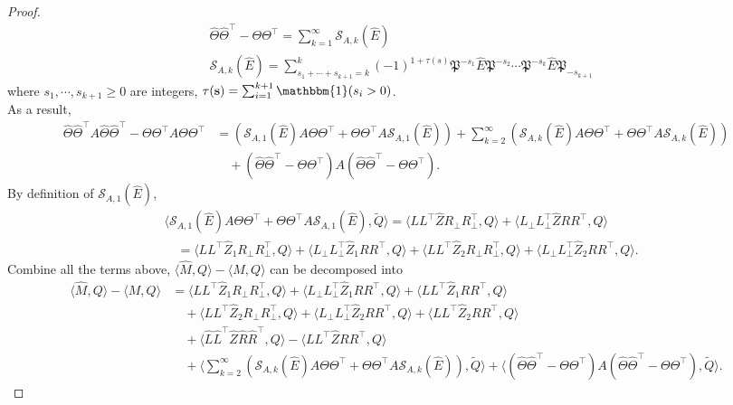 \documentclass[12pt]{article}
\newcommand{\inp}[2]{\langle #1,#2\rangle}
\theoremstyle{plain}
\begin{document}
\begin{proof}
\begin{align*}
    &\widehat{\Theta}\widehat{\Theta}^{\top}-\Theta\Theta^{\top}=\sum_{k=1}^{\infty}\mathcal{S}_{A,k}(\widehat{E}) \\
    &\mathcal{S}_{A,k}(\widehat{E})=\sum_{s_1+\cdots+s_{k+1}=k}^{k} (-1)^{1+\tau(s)} \mathfrak{P}^{-s_1}\widehat{E}\mathfrak{P}^{-s_2}\cdots\mathfrak{P}^{-s_k}\widehat{E}\mathfrak{P}_{-s_{k+1}}
\end{align*}
where $s_1,\cdots,s_{k+1}\geq 0$ are integers, $\tau(\mathbf{s})=\sum_{i=1}^{k+1}\mathbbm{1}(s_i>0)$. \\
As a result, 
\begin{align*}
    \widehat{\Theta}\widehat{\Theta}^{\top}A\widehat{\Theta}\widehat{\Theta}^{\top}-\Theta\Theta^{\top}A\Theta\Theta^{\top}&= (\mathcal{S}_{A,1}(\widehat{E})A\Theta\Theta^{\top}+\Theta\Theta^{\top}A\mathcal{S}_{A,1}(\widehat{E})) + \sum_{k=2}^{\infty} (\mathcal{S}_{A,k}(\widehat{E})A\Theta\Theta^{\top}+\Theta\Theta^{\top}A\mathcal{S}_{A,k}(\widehat{E})) \\ &\quad + (\widehat{\Theta}\widehat{\Theta}^{\top}-\Theta\Theta^{\top})A(\widehat{\Theta}\widehat{\Theta}^{\top}-\Theta\Theta^{\top}).
\end{align*}
By definition of $\mathcal{S}_{A,1}(\widehat{E})$, 
\begin{align*}
    &\inp{\mathcal{S}_{A,1}(\widehat{E})A\Theta\Theta^{\top}+\Theta\Theta^{\top}A\mathcal{S}_{A,1}(\widehat{E})}{\widetilde{Q}}= \inp{LL^{\top}\widehat{Z}R_{\perp}R_{\perp}^{\top}}{Q} + \inp{L_{\perp}L_{\perp}^{\top}\widehat{Z}RR^{\top}}{Q} \\
    &\quad =\inp{LL^{\top}\widehat{Z}_1R_{\perp}R_{\perp}^{\top}}{Q} + \inp{L_{\perp}L_{\perp}^{\top}\widehat{Z}_1RR^{\top}}{Q}  + \inp{LL^{\top}\widehat{Z}_2R_{\perp}R_{\perp}^{\top}}{Q} + \inp{L_{\perp}L_{\perp}^{\top}\widehat{Z}_2RR^{\top}}{Q}.
\end{align*}
Combine all the terms above, $\inp{\widehat{M}}{Q}-\inp{M}{Q}$ can be decomposed into
\begin{align}
    \inp{\widehat{M}}{Q}-\inp{M}{Q}&= \inp{LL^{\top}\widehat{Z}_1R_{\perp}R_{\perp}^{\top}}{Q} + \inp{L_{\perp}L_{\perp}^{\top}\widehat{Z}_1RR^{\top}}{Q} + \inp{LL^{\top}\widehat{Z}_1RR^{\top}}{Q} \label{main1} \\ &\quad + \inp{LL^{\top}\widehat{Z}_2R_{\perp}R_{\perp}^{\top}}{Q} + \inp{L_{\perp}L_{\perp}^{\top}\widehat{Z}_2RR^{\top}}{Q} + \inp{LL^{\top}\widehat{Z}_2RR^{\top}}{Q}\label{neg1} \\ &\quad + \inp{\widehat{L}\widehat{L}^{\top}\widehat{Z}\widehat{R}\widehat{R}^{\top}}{Q} - \inp{LL^{\top}\widehat{Z}RR^{\top}}{Q} \label{neg2} \\ &\quad + \inp{\sum_{k=2}^{\infty} (\mathcal{S}_{A,k}(\widehat{E})A\Theta\Theta^{\top}+\Theta\Theta^{\top}A\mathcal{S}_{A,k}(\widehat{E}))}{\widetilde{Q}} + \inp{(\widehat{\Theta}\widehat{\Theta}^{\top}-\Theta\Theta^{\top})A(\widehat{\Theta}\widehat{\Theta}^{\top}-\Theta\Theta^{\top})}{\widetilde{Q}}. \label{neg3}

\end{align}
\end{proof}
\end{document}
